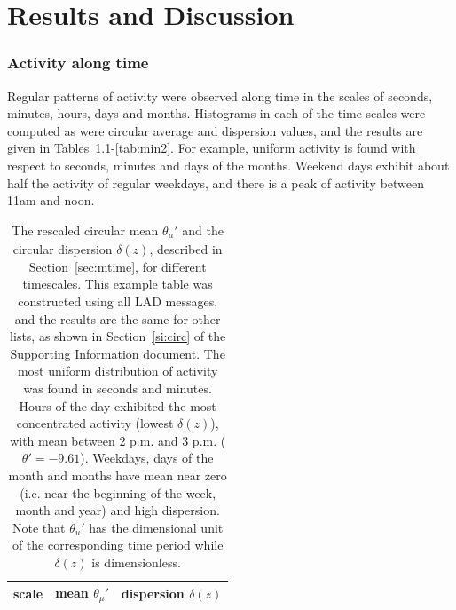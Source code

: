 

\chapter{Results and Discussion}
\label{ch:disc}
\subsection{Activity along time}\label{constDisc}
Regular patterns of activity were observed along time
in the scales of seconds, minutes, hours, days and months.
Histograms in each of the time scales were computed as were circular average and dispersion values, and the results are given in Tables~\ref{tab:circ}-\ref{tab:min2}. For example, uniform activity is found with respect to seconds, minutes and days of the months. Weekend days exhibit about half the activity of regular weekdays, and there is a peak of activity between 11am and noon.


\begin{table}
\caption{The rescaled circular mean $\theta_\mu'$ and the circular dispersion $\delta(z)$, described in Section~\ref{sec:mtime}, for different timescales. This example table was constructed using all LAD messages, and the results are the same for other lists, as shown in Section~\ref*{si:circ} of the Supporting Information document. The most uniform distribution of activity was found in seconds and minutes. 	Hours of the day exhibited the most concentrated activity (lowest $\delta(z)$), with mean between 2 p.m. and 3 p.m. ($\theta'=-9.61$). Weekdays, days of the month and months have mean near zero (i.e. near the beginning of the week, month and year) and high dispersion. Note that $\theta_u'$ has the dimensional unit of the corresponding time period while $\delta(z)$ is dimensionless.}
\begin{center}
\begin{tabular}{ |l|| c|c| }
\hline
scale & mean $\theta_\mu'$ & dispersion $\delta(z)$  \\ \hline

\end{tabular}
\end{center}
\label{tab:circ}
\end{table}

